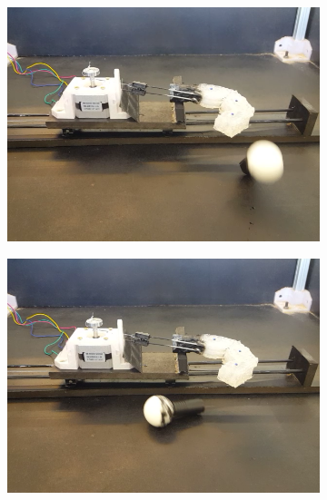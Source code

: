 \documentclass[letterpaper, 10 pt, conference]{ieeeconf}  %
\begin{document}
\begin{figure}[thpb]
\begin{subfigure}[b]{0.72in}
                \includegraphics[width=\textwidth]{figures/finger/finger4.png}
        \end{subfigure}
        \begin{subfigure}[b]{0.72in}                            
                \centering
                \includegraphics[width=\textwidth]{figures/finger/finger5.png}
        \end{subfigure}
        

\end{figure}
\end{document}
